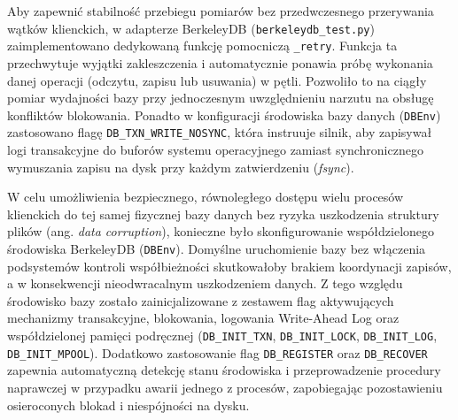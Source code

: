 Aby zapewnić stabilność przebiegu pomiarów bez przedwczesnego przerywania wątków klienckich, w adapterze BerkeleyDB (\texttt{berkeleydb\_test.py}) zaimplementowano dedykowaną funkcję pomocniczą \texttt{\_retry}. Funkcja ta przechwytuje wyjątki zakleszczenia i automatycznie ponawia próbę wykonania danej operacji (odczytu, zapisu lub usuwania) w pętli. Pozwoliło to na ciągły pomiar wydajności bazy przy jednoczesnym uwzględnieniu narzutu na obsługę konfliktów blokowania. Ponadto w konfiguracji środowiska bazy danych (\texttt{DBEnv}) zastosowano flagę \texttt{DB\_TXN\_WRITE\_NOSYNC}, która instruuje silnik, aby zapisywał logi transakcyjne do buforów systemu operacyjnego zamiast synchronicznego wymuszania zapisu na dysk przy każdym zatwierdzeniu (\emph{fsync}).

W celu umożliwienia bezpiecznego, równoległego dostępu wielu procesów klienckich do tej samej fizycznej bazy danych bez ryzyka uszkodzenia struktury plików (ang. \emph{data corruption}), konieczne było skonfigurowanie współdzielonego środowiska BerkeleyDB (\texttt{DBEnv}). Domyślne uruchomienie bazy bez włączenia podsystemów kontroli współbieżności skutkowałoby brakiem koordynacji zapisów, a w konsekwencji nieodwracalnym uszkodzeniem danych. Z tego względu środowisko bazy zostało zainicjalizowane z zestawem flag aktywujących mechanizmy transakcyjne, blokowania, logowania Write-Ahead Log oraz współdzielonej pamięci podręcznej (\texttt{DB\_INIT\_TXN}, \texttt{DB\_INIT\_LOCK}, \texttt{DB\_INIT\_LOG}, \texttt{DB\_INIT\_MPOOL}). Dodatkowo zastosowanie flag \texttt{DB\_REGISTER} oraz \texttt{DB\_RECOVER} zapewnia automatyczną detekcję stanu środowiska i przeprowadzenie procedury naprawczej w przypadku awarii jednego z procesów, zapobiegając pozostawieniu osieroconych blokad i niespójności na dysku.

